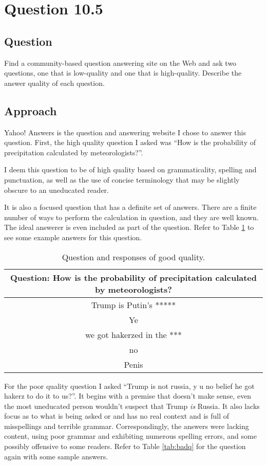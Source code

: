 \section{Question 10.5}

\subsection{Question}
Find a community-based question answering site on the Web and ask two
questions, one that is low-quality and one that is high-quality. Describe the answer quality of each question.

\subsection{Approach}
Yahoo! Answers is the question and answering website I chose to answer this question.  First, the high quality question I asked was ``How is the probability of precipitation calculated by meteorologists?''.  

I deem this question to be of high quality based on grammaticality, spelling and punctuation, as well as the use of concise terminology that may be slightly obscure to an uneducated reader.

It is also a focused question that has a definite set of answers.  There are a finite number of ways to perform the calculation in question, and they are well known.  The ideal answerer is even included as part of the question.  Refer to Table \ref{tab:goodq} to see some example answers for this question.


\begin{table}[H]
\centering
\begin{tabular}{ c }
Question: How is the probability of precipitation calculated by meteorologists?\\
\hline\hline
Trump is Putin's *****\\
\hline
Ye\\
\hline
we got hakerzed in the ***\\
\hline
no\\
\hline
Penis\\
\hline
\end{tabular}
\caption{Question and responses of good quality.}
\label{tab:goodq}
\end{table}


For the poor quality question I asked ``Trump is not russia, y u no belief he got hakerz to do it to us?''.  It begins with a premise that doesn't make sense, even the most uneducated person wouldn't suspect that Trump \textit{is} Russia.  It also lacks focus as to what is being asked or and has no real context and is full of misspellings and terrible grammar.  Correspondingly, the answers were lacking content, using poor grammar and exhibiting numerous spelling errors, and some possibly offensive to some readers.  Refer to Table \ref{tab:badq} for the question again with some sample answers.


